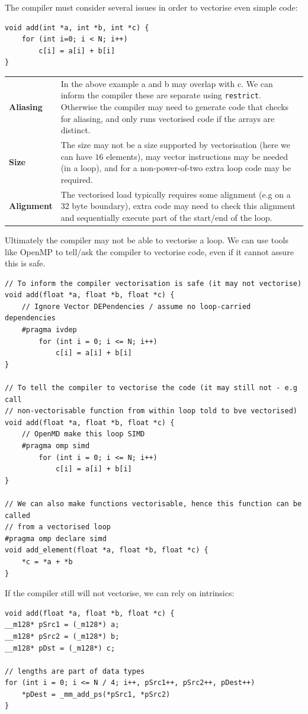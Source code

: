 The compiler must consider several issues in order to vectorise even simple code: 
\begin{verbatim}
void add(int *a, int *b, int *c) {
    for (int i=0; i < N; i++)
        c[i] = a[i] + b[i]
}
\end{verbatim}
\begin{center}
    \begin{tabular}{l p{}}
        \textbf{Aliasing} & In the above example a and b may overlap with c. We can inform the compiler these are separate using \texttt{restrict}. Otherwise the compiler may need to generate code that checks for aliasing, and only runs vectorised code if the arrays are distinct. \\
        \textbf{Size} & The size may not be a size supported by vectorisation (here we can have $16$ elements), may vector instructions may be needed (in a loop), and for a non-power-of-two extra loop code may be required. \\
        \textbf{Alignment} & The vectorised load typically requires some alignment (e.g on a 32 byte boundary), extra code may need to check this alignment and sequentially execute part of the start/end of the loop. \\
    \end{tabular}
\end{center}
Ultimately the compiler may not be able to vectorise a loop. We can use tools like OpenMP to tell/ask the compiler to vectorise code, even if it cannot assure this is safe.
\begin{verbatim}
// To inform the compiler vectorisation is safe (it may not vectorise)
void add(float *a, float *b, float *c) {
    // Ignore Vector DEPendencies / assume no loop-carried dependencies
    #pragma ivdep
        for (int i = 0; i <= N; i++)
            c[i] = a[i] + b[i]
}

// To tell the compiler to vectorise the code (it may still not - e.g call 
// non-vectorisable function from within loop told to bve vectorised)
void add(float *a, float *b, float *c) {
    // OpenMD make this loop SIMD
    #pragma omp simd
        for (int i = 0; i <= N; i++)
            c[i] = a[i] + b[i]
}

// We can also make functions vectorisable, hence this function can be called 
// from a vectorised loop
#pragma omp declare simd
void add_element(float *a, float *b, float *c) {
    *c = *a + *b
}
\end{verbatim}
If the compiler still will not vectorise, we can rely on intrinsics:
\begin{verbatim}
void add(float *a, float *b, float *c) {
__m128* pSrc1 = (_m128*) a;
__m128* pSrc2 = (_m128*) b;
__m128* pDst = (_m128*) c;

// lengths are part of data types
for (int i = 0; i <= N / 4; i++, pSrc1++, pSrc2++, pDest++)
    *pDest = _mm_add_ps(*pSrc1, *pSrc2)
}
\end{verbatim}

